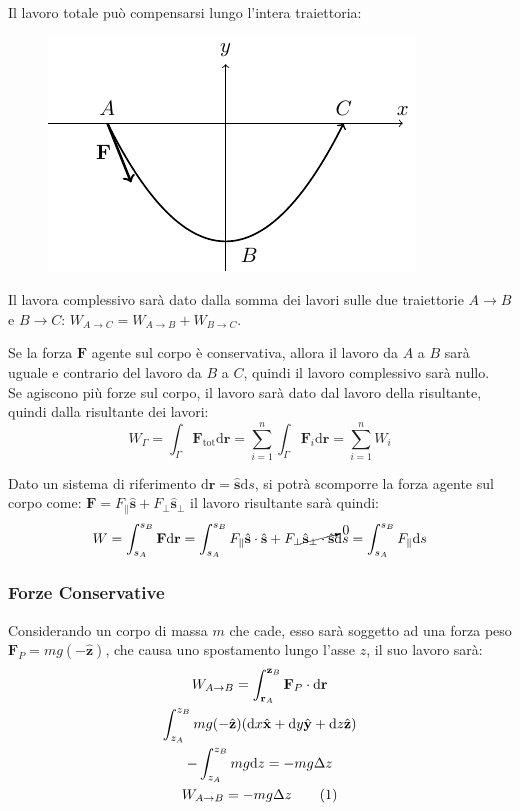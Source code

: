 \documentclass{article}
\newcommand{\vect}[1]{\boldsymbol{\mathbf{#1}}}
\newcommand{\df}{\mathrm{d}}
\numberwithin{equation}{subsection}
\begin{document}
Il lavoro totale può compensarsi lungo l'intera 
traiettoria:
\begin{figure}[H]%
    \centering
    \includegraphics{lavoro-2.pdf}%
\end{figure}


Il lavora complessivo sarà dato dalla somma dei lavori sulle due traiettorie $A\to B$ e $B\to C$: $W_{A\to C}=W_{A\to B}+W_{B\to C}$. 


Se la forza $\vect{F}$ agente sul corpo è conservativa, allora il lavoro 
da $A$ a $B$ sarà uguale e contrario del lavoro da $B$ a $C$, 
quindi il lavoro complessivo sarà nullo.
\\
Se agiscono più forze sul corpo, il lavoro sarà dato dal 
lavoro della risultante, quindi dalla risultante dei lavori:
\begin{equation}
    W_{\Gamma}=\displaystyle\int_{\Gamma}\vect{F}_\mathrm{tot}\df\vect{r}=\sum_{i=1}^{n}\int_{\Gamma}\vect{F}_i\df\vect{r}=\sum_{i=1}^{n}W_i
\end{equation}

Dato un sistema di riferimento $\df\vect{r}=\hat{\vect{s}}\df s$, si potrà 
scomporre la forza agente sul corpo come: $\vect{F}=F_{\parallel}\hat{\vect{s}}+F_{\perp}\hat{\vect{s}}_{\perp}$ 
il lavoro risultante sarà quindi: 
\begin{equation}
    W=\int_{s_A}^{s_B}\vect{F}\df\vect{r}=\int_{s_A}^{s_B}F_{\parallel}\hat{\vect{s}}\cdot\hat{\vect{s}}+F_{\perp}\cancelto{0}{\hat{\vect{s}}_{\perp}\cdot\hat{\vect{s}}}\df s=\int_{s_A}^{s_B}F_{\parallel}\df s
\end{equation}

\subsubsection{Forze Conservative}

Considerando un corpo di massa $m$ che cade, esso sarà soggetto 
ad una forza peso $\vect{F}_P=mg(-\hat{\vect{z}})$, che causa uno spostamento 
lungo l'asse $z$, il suo lavoro sarà:
\begin{gather*}
    W_{A\to B}=\displaystyle\int_{\vect{r}_A}^{\vect{z}_B}\vect{F}_P\cdot \df\vect{r}\\
    \displaystyle\int_{z_A}^{z_B}mg(-\hat{\vect{z}})(\df x\hat{\vect{x}}+\df y\hat{\vect{y}}+\df z\hat{\vect{z}})\\
    \displaystyle-\int_{z_A}^{z_B}mg \df z=-mg\Delta z\\
    W_{A\to B}=-mg\Delta z\tag{\stepcounter{equation}\theequation}
\end{gather*}
\end{document}
